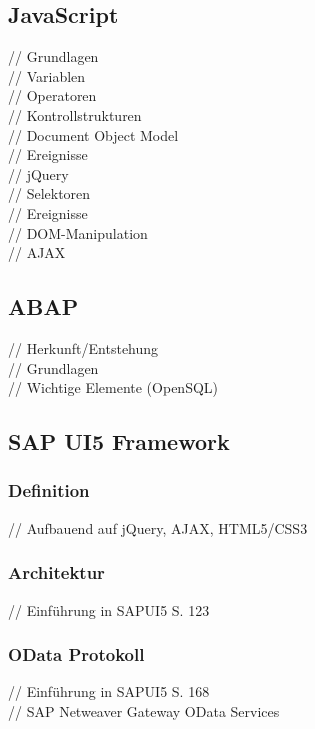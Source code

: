 \documentclass[12pt,a4paper,bibliography=totocnumbered,listof=totocnumbered]{scrartcl}
\begin{document}
\subsection{JavaScript}
// Grundlagen\\
// Variablen\\
// Operatoren\\
// Kontrollstrukturen\\
// Document Object Model\\
// Ereignisse\\

// jQuery\\
// Selektoren\\
// Ereignisse\\
// DOM-Manipulation\\
// AJAX\\

\subsection{ABAP}
// Herkunft/Entstehung\\
// Grundlagen\\
// Wichtige Elemente (OpenSQL)\\

\subsection{SAP UI5 Framework}
\subsubsection{Definition}
// Aufbauend auf jQuery, AJAX, HTML5/CSS3 \cite{AntoEinf2014}\\

\subsubsection{Architektur}
// Einführung in SAPUI5 S. 123 \cite{AntoEinf2014}\\

\subsubsection{OData Protokoll}
// Einführung in SAPUI5 S. 168 \\
// SAP Netweaver Gateway OData Services\\

\pagebreak
\end{document}
